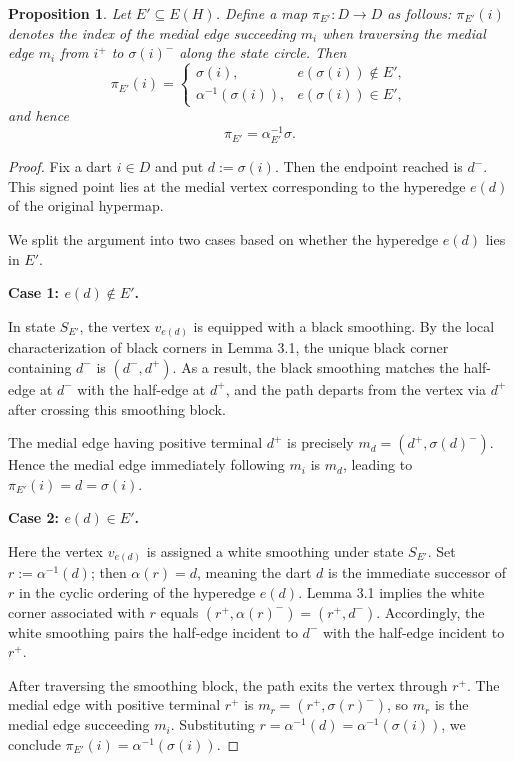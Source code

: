 \documentclass{article}
\newtheorem{proposition}[theorem]{Proposition}
\begin{document}
\begin{proposition}\label{prop:state-successor}
Let \(E'\subseteq E(H)\). Define a map \(\pi_{E'}: D \to D\) as follows: $\pi_{E'}(i)$ denotes the index of the medial edge succeeding $m_i$ when traversing the medial edge $m_i$ from $i^+$ to $\sigma(i)^-$ along the state circle. Then
\[
\pi_{E'}(i) =
\begin{cases}
\sigma(i), & e(\sigma(i)) \notin E',\\
\alpha^{-1}(\sigma(i)), & e(\sigma(i))\in E',
\end{cases}
\tag{4.1}
\]
and hence
\[
\pi_{E'} = \alpha^{-1}_{E'}\sigma.
\]
\end{proposition}
\begin{proof}
Fix a dart \(i\in D\) and put \(d:=\sigma(i)\). Then the endpoint reached is \(d^-\). This signed point lies at the medial vertex corresponding to
the hyperedge \(e(d)\) of the original hypermap.

We split the argument into two cases based on whether the hyperedge \(e(d)\) lies in \(E'\).

\medskip
\noindent
\textbf{Case 1: \(e(d)\notin E'\).}
\medskip

In state \(S_{E'}\), the vertex \(v_{e(d)}\) is equipped with a black smoothing. By the local characterization of black corners in Lemma 3.1, the unique black corner containing \(d^-\) is \((d^-,d^+)\). As a result, the black smoothing matches the half-edge at \(d^-\) with the half-edge at \(d^+\), and the path departs from the vertex via \(d^+\) after crossing this smoothing block.

The medial edge having positive terminal \(d^+\) is precisely \(m_d=(d^+,\sigma(d)^-)\). Hence the medial edge immediately following \(m_i\) is \(m_d\), leading to \(\pi_{E'}(i)=d=\sigma(i)\).

\medskip
\noindent
\textbf{Case 2: \(e(d)\in E'\).}
\medskip

Here the vertex \(v_{e(d)}\) is assigned a white smoothing under state \(S_{E'}\). Set \(r:=\alpha^{-1}(d)\); then \(\alpha(r)=d\), meaning the dart \(d\) is the immediate successor of \(r\) in the cyclic ordering of the hyperedge \(e(d)\). Lemma 3.1 implies the white corner associated with \(r\) equals \((r^+,\alpha(r)^-)=(r^+,d^-)\). Accordingly, the white smoothing pairs the half-edge incident to \(d^-\) with the half-edge incident to \(r^+\).

After traversing the smoothing block, the path exits the vertex through \(r^+\). The medial edge with positive terminal \(r^+\) is \(m_r=(r^+,\sigma(r)^-)\), so \(m_r\) is the medial edge succeeding \(m_i\). Substituting \(r=\alpha^{-1}(d)=\alpha^{-1}(\sigma(i))\), we conclude \(\pi_{E'}(i)=\alpha^{-1}(\sigma(i))\).

\end{proof}
\end{document}
